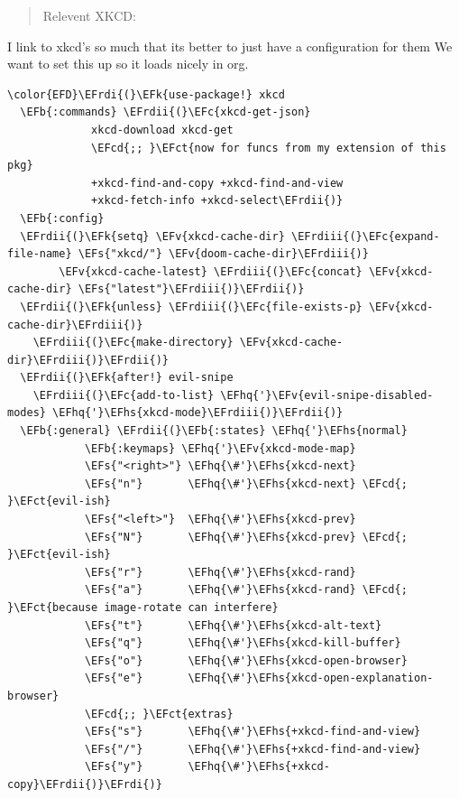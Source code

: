 \documentclass{scrartcl}
\newcommand{\EFk}[1]{\textcolor{EFk}{#1}} %
\newcommand{\EFs}[1]{\textcolor{EFs}{#1}} %
\newcommand{\EFb}[1]{\textcolor{EFb}{#1}} %
\newcommand{\EFct}[1]{\textcolor{EFct}{#1}} %
\newcommand{\EFc}[1]{\textcolor{EFc}{#1}} %
\newcommand{\EFv}[1]{\textcolor{EFv}{#1}} %
\newcommand{\EFcd}[1]{\textcolor{EFcd}{#1}} %
\newcommand{\EFhq}[1]{\textcolor{EFhq}{#1}} %
\newcommand{\EFhs}[1]{\textcolor{EFhs}{#1}} %
\newcommand{\EFrdi}[1]{\textcolor{EFrdi}{#1}} %
\newcommand{\EFrdii}[1]{\textcolor{EFrdii}{#1}} %
\newcommand{\EFrdiii}[1]{\textcolor{EFrdiii}{#1}} %
\begin{document}
\begin{quote}
Relevent XKCD:
\end{quote}

I link to xkcd's so much that its better to just have a configuration for them
We want to set this up so it loads nicely in org.
\begin{Code}
\begin{Verbatim}[]
\color{EFD}\EFrdi{(}\EFk{use-package!} xkcd
  \EFb{:commands} \EFrdii{(}\EFc{xkcd-get-json}
             xkcd-download xkcd-get
             \EFcd{;; }\EFct{now for funcs from my extension of this pkg}
             +xkcd-find-and-copy +xkcd-find-and-view
             +xkcd-fetch-info +xkcd-select\EFrdii{)}
  \EFb{:config}
  \EFrdii{(}\EFk{setq} \EFv{xkcd-cache-dir} \EFrdiii{(}\EFc{expand-file-name} \EFs{"xkcd/"} \EFv{doom-cache-dir}\EFrdiii{)}
        \EFv{xkcd-cache-latest} \EFrdiii{(}\EFc{concat} \EFv{xkcd-cache-dir} \EFs{"latest"}\EFrdiii{)}\EFrdii{)}
  \EFrdii{(}\EFk{unless} \EFrdiii{(}\EFc{file-exists-p} \EFv{xkcd-cache-dir}\EFrdiii{)}
    \EFrdiii{(}\EFc{make-directory} \EFv{xkcd-cache-dir}\EFrdiii{)}\EFrdii{)}
  \EFrdii{(}\EFk{after!} evil-snipe
    \EFrdiii{(}\EFc{add-to-list} \EFhq{'}\EFv{evil-snipe-disabled-modes} \EFhq{'}\EFhs{xkcd-mode}\EFrdiii{)}\EFrdii{)}
  \EFb{:general} \EFrdii{(}\EFb{:states} \EFhq{'}\EFhs{normal}
            \EFb{:keymaps} \EFhq{'}\EFv{xkcd-mode-map}
            \EFs{"<right>"} \EFhq{\#'}\EFhs{xkcd-next}
            \EFs{"n"}       \EFhq{\#'}\EFhs{xkcd-next} \EFcd{; }\EFct{evil-ish}
            \EFs{"<left>"}  \EFhq{\#'}\EFhs{xkcd-prev}
            \EFs{"N"}       \EFhq{\#'}\EFhs{xkcd-prev} \EFcd{; }\EFct{evil-ish}
            \EFs{"r"}       \EFhq{\#'}\EFhs{xkcd-rand}
            \EFs{"a"}       \EFhq{\#'}\EFhs{xkcd-rand} \EFcd{; }\EFct{because image-rotate can interfere}
            \EFs{"t"}       \EFhq{\#'}\EFhs{xkcd-alt-text}
            \EFs{"q"}       \EFhq{\#'}\EFhs{xkcd-kill-buffer}
            \EFs{"o"}       \EFhq{\#'}\EFhs{xkcd-open-browser}
            \EFs{"e"}       \EFhq{\#'}\EFhs{xkcd-open-explanation-browser}
            \EFcd{;; }\EFct{extras}
            \EFs{"s"}       \EFhq{\#'}\EFhs{+xkcd-find-and-view}
            \EFs{"/"}       \EFhq{\#'}\EFhs{+xkcd-find-and-view}
            \EFs{"y"}       \EFhq{\#'}\EFhs{+xkcd-copy}\EFrdii{)}\EFrdi{)}
\end{Verbatim}
\end{Code}
\end{document}
